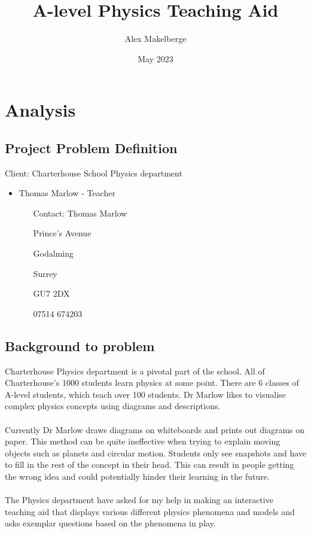 \documentclass[12pt]{article}
\title{A-level Physics Teaching Aid}
\author{Alex Makelberge}
\date{May 2023}
\begin{document}
\pagestyle{fancy}

\maketitle

\newpage
\tableofcontents
\newpage

\section{Analysis}

\subsection{Project Problem Definition}
Client: Charterhouse School Physics department
\begin{itemize}
\setlength\itemsep{-0.25em}
    \item Thomas Marlow - Teacher
    
\begin{itemize}
\setlength\itemsep{-0.25em}
    \item[Contact: ]Thomas Marlow
    \item[] Prince's Avenue
    \item[] Godalming
    \item[] Surrey
    \item[] GU7 2DX
    \item[] 07514 674203
\end{itemize}

\end{itemize}

\subsection{Background to problem}

Charterhouse Physics department is a pivotal part of the school. All of Charterhouse's 1000 students learn physics at some point. There are 6 classes of A-level students, which teach over 100 students. Dr Marlow likes to visualise complex physics concepts using diagrams and descriptions. \\\\
Currently Dr Marlow draws diagrams on whiteboards and prints out diagrams on paper. This method can be quite ineffective when trying to explain moving objects such as planets and circular motion. Students only see snapshots and have to fill in the rest of the concept in their head. This can result in people getting the wrong idea and could potentially hinder their learning in the future. \\\\
The Physics department have asked for my help in making an interactive teaching aid that displays various different physics phenomena and models and asks exemplar questions based on the phenomena in play.
\end{document}
